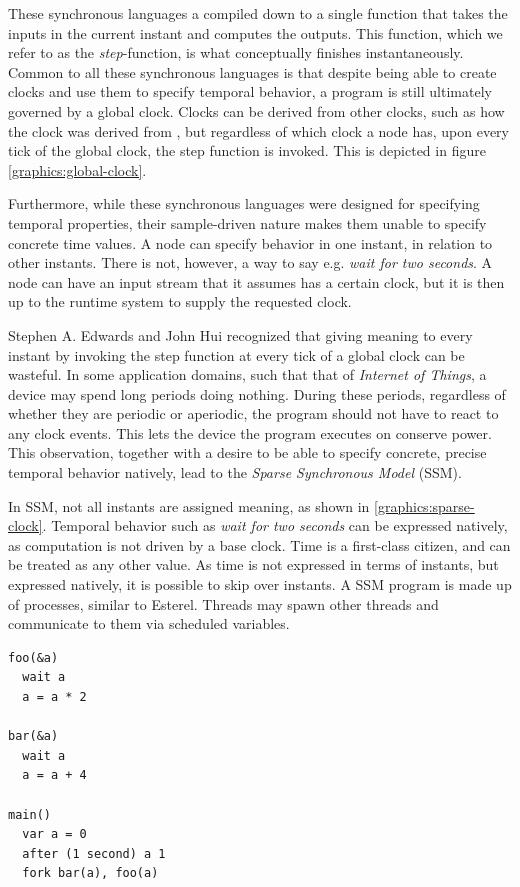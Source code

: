 These synchronous languages a compiled down to a single function that takes the inputs in the current instant and computes
the outputs. This function, which we refer to as the \textit{step}-function, is what conceptually finishes instantaneously.
Common to all these synchronous languages is that despite being able to create clocks and use them to specify
temporal behavior, a program is still ultimately governed by a global clock. Clocks can be derived from other clocks, such
as how the  clock was derived from , but regardless of which clock a node has, upon every tick of the
global clock, the step function is invoked. This is depicted in figure \ref{graphics:global-clock}.

Furthermore, while these synchronous languages were designed for specifying temporal properties, their sample-driven
nature makes them unable to specify concrete time values. A node can specify behavior in one instant, in relation to
other instants. There is not, however, a way to say e.g. \textit{wait for two seconds}. A node can have an input stream
that it assumes has a certain clock, but it is then up to the runtime system to supply the requested clock.

Stephen A. Edwards and John Hui \cite{DBLP:conf/fdl/EdwardsH20} recognized that giving meaning to every instant by invoking the
step function at every tick of a global clock can be
wasteful. In some application domains, such that that of \textit{Internet of Things}, a device may spend long periods doing nothing. During these periods, regardless of whether they are periodic or aperiodic, the program should not
have to react to any clock events. This lets the device the program executes on conserve power. This observation,
together with a desire to be able to specify concrete, precise temporal behavior natively, lead to the
\textit{Sparse Synchronous Model} (SSM).

In SSM, not all instants are assigned meaning, as shown in \ref{graphics:sparse-clock}. Temporal behavior such as
\textit{wait for two seconds} can be expressed natively, as computation is not driven by a base clock. Time is a
first-class citizen, and can be treated as any other value. As time is not expressed in terms of instants, but expressed
natively, it is possible to skip over instants. A SSM program is made up of processes, similar to Esterel. Threads may spawn
other threads and communicate to them via scheduled variables.

\begin{verbatim}
foo(&a)
  wait a
  a = a * 2

bar(&a)
  wait a
  a = a + 4

main()
  var a = 0
  after (1 second) a 1
  fork bar(a), foo(a)
\end{verbatim}

